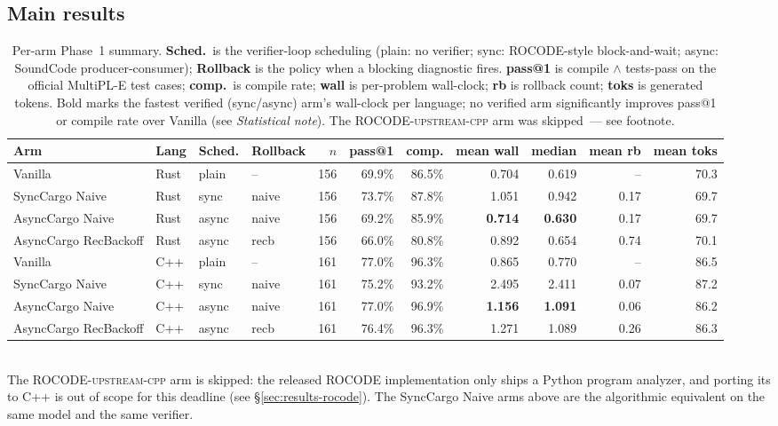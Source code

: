 \subsection{Main results}\label{sec:main-results}

\begin{table}[t]
\centering
\small
\setlength{\tabcolsep}{1.6pt}
\caption{Per-arm Phase~1 summary. \textbf{Sched.}\ is the
verifier-loop scheduling (\textsf{plain}: no verifier; \textsf{sync}:
ROCODE-style block-and-wait; \textsf{async}: SoundCode
producer-consumer); \textbf{Rollback} is the policy when a blocking
diagnostic fires. \textbf{pass@1} is compile $\wedge$ tests-pass on
the official MultiPL-E test cases; \textbf{comp.}\ is compile rate;
\textbf{wall} is per-problem
wall-clock; \textbf{rb} is rollback count; \textbf{toks} is generated
tokens. Bold marks the fastest verified (sync/async) arm's
wall-clock per language; no verified arm significantly improves
pass@1 or compile rate over \textsf{Vanilla} (see
\emph{Statistical note}). The
\textsc{ROCODE-upstream-cpp} arm was skipped~--- see footnote.}
\label{tab:main}
\begin{tabular}{llllrrrrrrr}
\toprule
Arm & Lang & Sched. & Rollback & $n$ & pass@1 & comp. & mean wall & median & mean rb & mean toks \\
\midrule
Vanilla            & Rust & plain  & --      & 156 & 69.9\% & 86.5\% & 0.704          & 0.619          & --   & 70.3 \\
SyncCargo Naive    & Rust & sync   & naive   & 156 & 73.7\% & 87.8\% & 1.051          & 0.942          & 0.17 & 69.7 \\
AsyncCargo Naive   & Rust & async  & naive   & 156 & 69.2\% & 85.9\% & \textbf{0.714} & \textbf{0.630} & 0.17 & 69.7 \\
AsyncCargo RecBackoff & Rust & async  & recb & 156 & 66.0\% & 80.8\% & 0.892          & 0.654          & 0.74 & 70.1 \\
\midrule
Vanilla            & C++  & plain  & --      & 161 & 77.0\% & 96.3\% & 0.865          & 0.770          & --   & 86.5 \\
SyncCargo Naive    & C++  & sync   & naive   & 161 & 75.2\% & 93.2\% & 2.495          & 2.411          & 0.07 & 87.2 \\
AsyncCargo Naive   & C++  & async  & naive   & 161 & 77.0\% & 96.9\% & \textbf{1.156} & \textbf{1.091} & 0.06 & 86.2 \\
AsyncCargo RecBackoff & C++  & async  & recb & 161 & 76.4\% & 96.3\% & 1.271          & 1.089          & 0.26 & 86.3 \\
\bottomrule
\end{tabular}
\\[2pt]
{\footnotesize The \textsc{ROCODE-upstream-cpp} arm is skipped: the
released ROCODE implementation only ships a Python program analyzer,
and porting its  to C++ is out of scope for this
deadline (see \S\ref{sec:results-rocode}). The \textsf{SyncCargo
Naive} arms above are the algorithmic equivalent on the same model
and the same verifier.}
\end{table}

